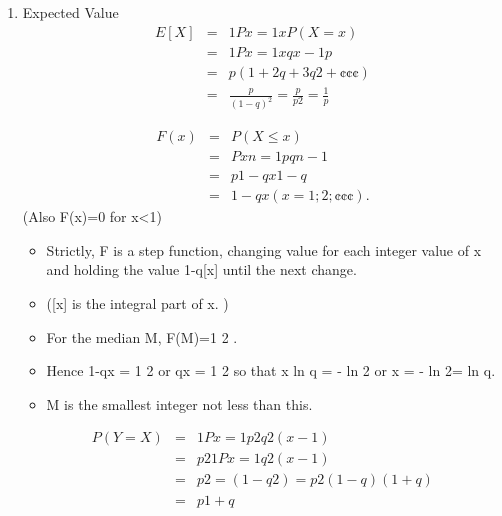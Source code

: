 \documentclass[a4paper,12pt]{article}
\begin{document}
\begin{enumerate}
    \item Expected Value
\begin{eqnarray*}
E[X] &=&
1P
x=1
xP(X = x) \\&=&
1P
x=1
xqx- 1p \\&=& p(1 + 2q + 3q2 + ¢ ¢ ¢)
\\&=& \frac{p}{(1 -  q)^2} = \frac{p}{p2} = \frac{1}{p} 
\end{eqnarray*}

\begin{eqnarray*}
F(x)&=&P(X \leq x)\\&=&
Px
n=1
pqn- 1 \\&=&  p1- qx
1- q \\&=& 1 -  qx (x = 1; 2; ¢ ¢ ¢) .
\end{eqnarray*}
(Also F(x)=0 for x<1)
\begin{itemize}
    \item Strictly, F is a step function, changing value for each integer value of x and holding the value
1-q[x] until the next change.
\item ([x] is the integral part of x. )
\item For the median M, F(M)=1
2 .
\item Hence 1-qx = 1
2 or qx = 1
2 so that x ln q = - ln 2 or x = - ln 2= ln q. 
\item M is the smallest integer not
less than this.
\end{itemize}

\begin{eqnarray*}
P(Y=X)  
&=&
1P
x=1
p2q2(x- 1) \\&=& p2
1P
x=1
q2(x- 1) \\&=& p2=(1 -  q2) = p2
(1- q)(1+q) \\ &=& p
1+q
\end{eqnarray*}

\end{enumerate}
\end{document}
